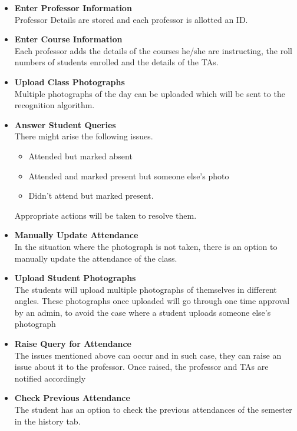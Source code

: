 \documentclass[paper=a4, fontsize=15pt]{scrartcl}
\begin{document}
\begin{multicols}{2}

\begin{itemize}
    
    \item \textbf{Enter Professor Information}\\ Professor Details are stored and each professor is allotted an ID.
    \item \textbf{Enter Course Information} \\ Each professor adds the details of the courses he/she are instructing, the roll numbers of students enrolled and the details of the TAs.
    \item \textbf{Upload Class Photographs}\\ Multiple photographs of the day can be uploaded which will be sent to the recognition algorithm.
    \item \textbf{Answer Student Queries} \\ There might arise the following issues.\\
    \begin{itemize}
        \item Attended but marked absent
        \item Attended and marked present but someone else's photo
        \item Didn't attend but marked present.
    \end{itemize}
    Appropriate actions will be taken to resolve them.
    \item \textbf{Manually Update Attendance} \\ In the situation where the photograph is not taken, there is an option to manually update the attendance of the class.
    \item \textbf{Upload Student Photographs} \\ The students will upload multiple photographs of themselves in different angles. These photographs once uploaded will go through one time approval by an admin, to avoid the case where a student uploads someone else's photograph
    \item \textbf{Raise Query for Attendance} \\ The issues mentioned above can occur and in such case, they can raise an issue about it to the professor. Once raised, the professor and TAs are notified accordingly
    \item \textbf{Check Previous Attendance} \\ The student has an option to check the previous attendances of the semester in the history tab.   
    
    
\end{itemize}


\end{multicols}
\end{document}
